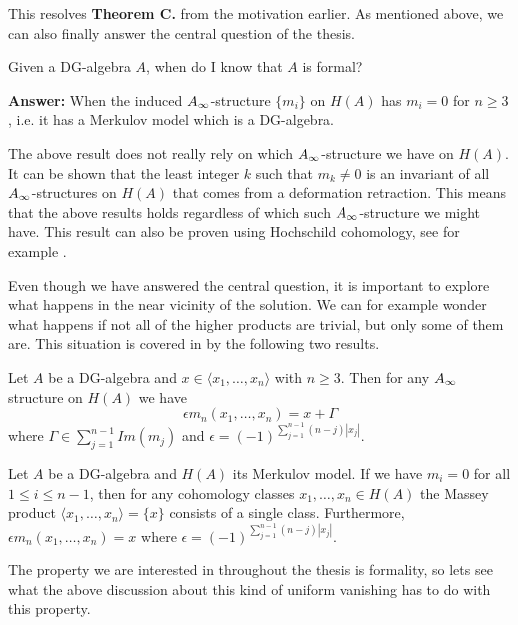 This resolves \textbf{Theorem C.} from the motivation earlier. As mentioned above, we can also finally answer the central question of the thesis. 
\begin{central}
Given a DG-algebra $A$, when do I know that $A$ is formal?
\end{central}

\textbf{Answer:} When the induced $A_{\infty}$-structure $\{m_i\}$ on $H(A)$ has $m_i=0$ for $n\geq 3$, i.e. it has a Merkulov model which is a DG-algebra.  

The above result does not really rely on which $A_{\infty}$-structure we have on $H(A)$. It can be shown that the least integer $k$ such that $m_k \neq 0$ is an invariant of all $A_{\infty}$-structures on $H(A)$ that comes from a deformation retraction. This means that the above results holds regardless of which such $A_{\infty}$-structure we might have. This result can also be proven using Hochschild cohomology, see for example \cite[Theorem 3.3.]{berglund}.

Even though we have answered the central question, it is important to explore what happens in the near vicinity of the solution. We can for example wonder what happens if not all of the higher products are trivial, but only some of them are. This situation is covered in \cite{detection} by the following two results.

\begin{theorem}
\label{thm:infty_massey_recovers_massey}
Let $A$ be a DG-algebra and $x\in \langle x_1, \ldots, x_n\rangle$ with $n\geq 3$. Then for any $A_{\infty}$ structure on $H(A)$ we have 
\begin{equation*}
    \epsilon m_n(x_1, \ldots, x_n) = x+\Gamma 
\end{equation*}
where $\Gamma \in \sum_{j=1}^{n-1}Im(m_j)$ and $\epsilon = (-1)^{\sum_{j=1}^{n-1} (n-j)|x_j|}$. 
\end{theorem}

\begin{corollary}
\label{cor:uniquely_defined}
Let $A$ be a DG-algebra and $H(A)$ its Merkulov model. If we have $m_i=0$ for all $1\leq i\leq n-1$, then for any cohomology classes $x_1, \ldots, x_n \in H(A)$ the Massey product $\langle x_1, \ldots, x_n\rangle = \{ x\}$ consists of a single class. Furthermore, $\epsilon m_n(x_1, \ldots, x_n)=x$ where $\epsilon = (-1)^{\sum_{j=1}^{n-1} (n-j)|x_j|}$.
\end{corollary}

The property we are interested in throughout the thesis is formality, so lets see what the above discussion about this kind of uniform vanishing has to do with this property. 

